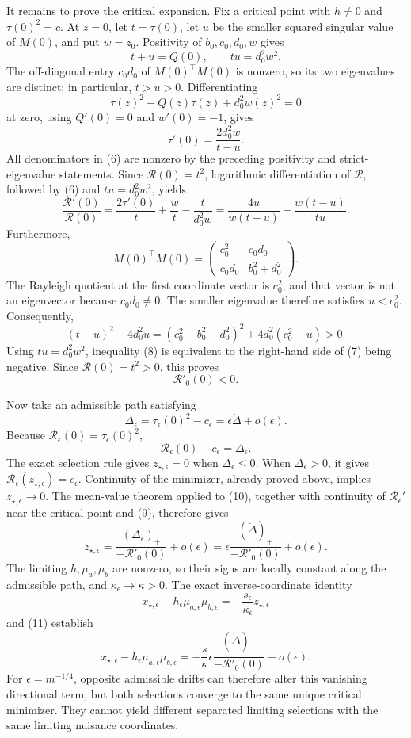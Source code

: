 It remains to prove the critical expansion.  Fix a critical point with \(h\neq0\) and \(\tau(0)^2=c\).  At \(z=0\), let \(t=\tau(0)\), let \(u\) be the smaller squared singular value of \(M(0)\), and put \(w=z_0\).  Positivity of \(b_0,c_0,d_0,w\) gives
\[
 t+u=Q(0),
 \qquad
 tu=d_0^2w^2.
\]
The off-diagonal entry \(c_0d_0\) of \(M(0)^{\top}M(0)\) is nonzero, so its two eigenvalues are distinct; in particular, \(t>u>0\).  Differentiating
\[
 \tau(z)^2-Q(z)\tau(z)+d_0^2w(z)^2=0
\]
at zero, using \(Q'(0)=0\) and \(w'(0)=-1\), gives
\[
 \tau'(0)=\frac{2d_0^2w}{t-u}. \tag{6}
\]
All denominators in (6) are nonzero by the preceding positivity and strict-eigenvalue statements.  Since \(\mathcal R(0)=t^2\), logarithmic differentiation of \(\mathcal R\), followed by (6) and \(tu=d_0^2w^2\), yields
\[
 \frac{\mathcal R'(0)}{\mathcal R(0)}
 =\frac{2\tau'(0)}t+\frac wt-\frac{t}{d_0^2w}
 =\frac{4u}{w(t-u)}-\frac{w(t-u)}{tu}. \tag{7}
\]
Furthermore,
\[
 M(0)^{\top}M(0)
 =\begin{pmatrix}c_0^2&c_0d_0\\c_0d_0&b_0^2+d_0^2\end{pmatrix}.
\]
The Rayleigh quotient at the first coordinate vector is \(c_0^2\), and that vector is not an eigenvector because \(c_0d_0\neq0\).  The smaller eigenvalue therefore satisfies \(u<c_0^2\).  Consequently,
\[
 (t-u)^2-4d_0^2u
 =(c_0^2-b_0^2-d_0^2)^2+4d_0^2(c_0^2-u)>0. \tag{8}
\]
Using \(tu=d_0^2w^2\), inequality (8) is equivalent to the right-hand side of (7) being negative.  Since \(\mathcal R(0)=t^2>0\), this proves
\[
 \mathcal R'_0(0)<0. \tag{9}
\]

Now take an admissible path satisfying
\[
 \Delta_\epsilon=\tau_\epsilon(0)^2-c_\epsilon
 =\epsilon\dot\Delta+o(\epsilon).
\]
Because \(\mathcal R_\epsilon(0)=\tau_\epsilon(0)^2\),
\[
 \mathcal R_\epsilon(0)-c_\epsilon=\Delta_\epsilon. \tag{10}
\]
The exact selection rule gives \(z_{\star,\epsilon}=0\) when \(\Delta_\epsilon\leq0\).  When \(\Delta_\epsilon>0\), it gives \(\mathcal R_\epsilon(z_{\star,\epsilon})=c_\epsilon\).  Continuity of the minimizer, already proved above, implies \(z_{\star,\epsilon}\to0\).  The mean-value theorem applied to (10), together with continuity of \(\mathcal R_\epsilon'\) near the critical point and (9), therefore gives
\[
 z_{\star,\epsilon}
 =\frac{(\Delta_\epsilon)_+}{-\mathcal R'_0(0)}+o(\epsilon)
 =\epsilon\frac{(\dot\Delta)_+}{-\mathcal R'_0(0)}+o(\epsilon). \tag{11}
\]
The limiting \(h,\mu_a,\mu_b\) are nonzero, so their signs are locally constant along the admissible path, and \(\kappa_\epsilon\to\kappa>0\).  The exact inverse-coordinate identity
\[
 x_{\star,\epsilon}-h_\epsilon\mu_{a,\epsilon}\mu_{b,\epsilon}
 =-\frac{s_\epsilon}{\kappa_\epsilon}z_{\star,\epsilon}
\]
and (11) establish
\[
 x_{\star,\epsilon}-h_\epsilon\mu_{a,\epsilon}\mu_{b,\epsilon}
 =-\frac{s}{\kappa}\epsilon
 \frac{(\dot\Delta)_+}{-\mathcal R'_0(0)}+o(\epsilon).
\]
For \(\epsilon=m^{-1/4}\), opposite admissible drifts can therefore alter this vanishing directional term, but both selections converge to the same unique critical minimizer.  They cannot yield different separated limiting selections with the same limiting nuisance coordinates.
